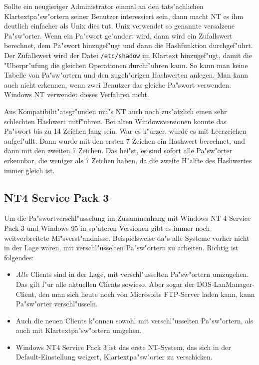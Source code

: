 \documentclass{scrartcl}\usepackage{pslatex}\typearea{12}
\newcommand{\dateistyle}{\texttt}
\begin{document}
Sollte ein neugieriger Administrator einmal an den tats"achlichen
Klartextpa"sw"ortern seiner Benutzer interessiert sein, dann macht NT
es ihm deutlich einfacher als Unix dies tut. Unix verwendet so
genannte versalzene Pa"sw"orter. Wenn ein Pa"swort ge"andert wird,
dann wird ein Zufallswert berechnet, dem Pa"swort hinzugef"ugt und
dann die Hashfunktion durchgef"uhrt. Der Zufallswert wird der Datei
\dateistyle{/etc/shadow} im Klartext hinzugef"ugt, damit die
"Uberpr"ufung die gleichen Operationen durchf"uhren kann. So kann man
keine Tabelle von Pa"sw"ortern und den zugeh"origen Hashwerten
anlegen. Man kann auch nicht erkennen, wenn zwei Benutzer das gleiche
Pa"swort verwenden. Windows NT verwendet dieses Verfahren nicht.

Aus Kompatibilit"atsgr"unden mu"s NT auch noch zus"atzlich einen sehr
schlechten Hashwert mitf"uhren. Bei alten Windowsversionen konnte das
Pa"swort bis zu 14 Zeichen lang sein. War es k"urzer, wurde es mit
Leerzeichen aufgef"ullt. Dann wurde mit den ersten 7 Zeichen ein
Hashwert berechnet, und dann mit den zweiten 7 Zeichen. Das hei"st, es
sind sofort alle Pa"sw"orter erkennbar, die weniger als 7 Zeichen
haben, da die zweite H"alfte des Hashwertes immer gleich ist.

\subsection{NT4 Service Pack 3}

Um die Pa"swortverschl"usselung im Zusammenhang mit Windows NT 4
Service Pack 3 und Windows 95 in sp"ateren Versionen gibt es immer
noch weitverbreitete Mi"sverst"andnisse. Beispielsweise da"s alle
Systeme vorher nicht in der Lage waren, mit verschl"usselten
Pa"sw"ortern zu arbeiten. Richtig ist folgendes:

\begin{itemize}
\item \emph{Alle} Clients sind in der Lage, mit verschl"usselten
  Pa"sw"ortern umzugehen. Das gilt f"ur alle aktuellen Clients
  sowieso. Aber sogar der DOS-LanManager-Client, den man sich heute
  noch von Microsofts FTP-Server laden kann, kann Pa"sw"orter
  verschl"usseln.
\item Auch die neuen Clients k"onnen sowohl mit verschl"usselten
  Pa"sw"ortern, als auch mit Klartextpa"sw"ortern umgehen.
\item Windows NT4 Service Pack 3 ist das erste NT-System, das sich in
  der Default-Einstellung weigert, Klartextpa"sw"orter zu verschicken.
\end{itemize}
\end{document}
